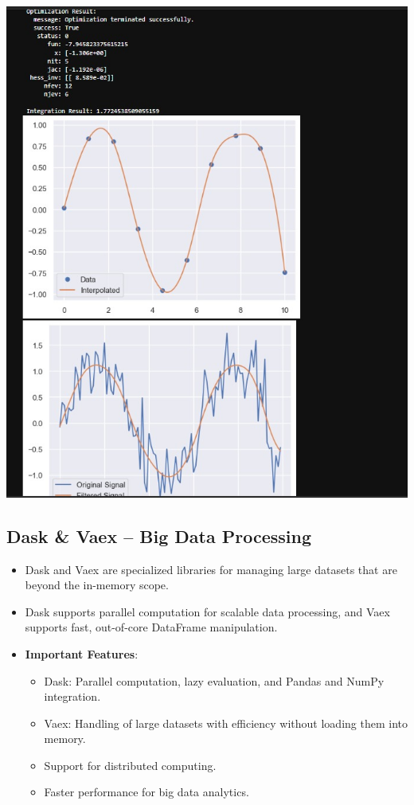 \documentclass{article}
\begin{document}
\includegraphics[width=14cm,height=20
cm]{SciPy_Output.jpeg}
\newpage
\subsection{Dask \& Vaex – Big Data Processing}
\begin{itemize}
    \item Dask and Vaex are specialized libraries for managing large datasets that are beyond the in-memory scope.
    \item Dask supports parallel computation for scalable data processing, and Vaex supports fast, out-of-core DataFrame manipulation.
\item \textbf{Important Features}:
    \begin{itemize}
    \item Dask: Parallel computation, lazy evaluation, and Pandas and NumPy integration.
    \item Vaex: Handling of large datasets with efficiency without loading them into memory.
    \item Support for distributed computing.
    \item Faster performance for big data analytics.
    \end{itemize}
\end{itemize}
\end{document}
